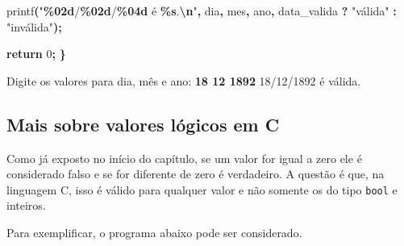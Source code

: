 \documentclass[
  11pt,
  a4paper,
]{scrbook}
\newenvironment{Shaded}{\begin{snugshade}}{\end{snugshade}}
\newcommand{\ControlFlowTok}[1]{\textcolor[rgb]{0.13,0.29,0.53}{\textbf{#1}}}
\newcommand{\DecValTok}[1]{\textcolor[rgb]{0.00,0.00,0.81}{#1}}
\newcommand{\KeywordTok}[1]{\textcolor[rgb]{0.13,0.29,0.53}{\textbf{#1}}}
\newcommand{\NormalTok}[1]{#1}
\newcommand{\OperatorTok}[1]{\textcolor[rgb]{0.81,0.36,0.00}{\textbf{#1}}}
\newcommand{\SpecialCharTok}[1]{\textcolor[rgb]{0.81,0.36,0.00}{\textbf{#1}}}
\newcommand{\StringTok}[1]{\textcolor[rgb]{0.31,0.60,0.02}{#1}}
\begin{document}
\begin{Shaded}
\begin{Highlighting}[]
\NormalTok{    printf}\OperatorTok{(}\StringTok{"}\SpecialCharTok{\%02d}\StringTok{/}\SpecialCharTok{\%02d}\StringTok{/}\SpecialCharTok{\%04d}\StringTok{ é }\SpecialCharTok{\%s}\StringTok{.}\SpecialCharTok{\textbackslash{}n}\StringTok{"}\OperatorTok{,}\NormalTok{ dia}\OperatorTok{,}\NormalTok{ mes}\OperatorTok{,}\NormalTok{ ano}\OperatorTok{,} 
\NormalTok{        data\_valida }\OperatorTok{?} \StringTok{"válida"} \OperatorTok{:} \StringTok{"inválida"}\OperatorTok{);}

    \ControlFlowTok{return} \DecValTok{0}\OperatorTok{;}
\OperatorTok{\}}
\end{Highlighting}
\end{Shaded}

\begin{Shaded}
\begin{Highlighting}[]
\NormalTok{Digite os valores para dia, mês e ano: }\KeywordTok{ 18 12 1892 }
\NormalTok{18/12/1892 é válida.}
\end{Highlighting}
\end{Shaded}

\subsection{Mais sobre valores lógicos em
C}\label{mais-sobre-valores-luxf3gicos-em-c}

Como já exposto no início do capítulo, se um valor for igual a zero ele
é considerado falso e se for diferente de zero é verdadeiro. A questão é
que, na linguagem C, isso é válido para qualquer valor e não somente os
do tipo \texttt{bool} e inteiros.

Para exemplificar, o programa abaixo pode ser considerado.
\end{document}
